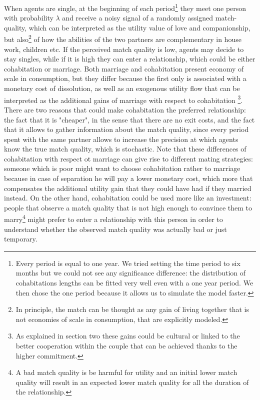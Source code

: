 \documentclass[12pt]{article}
\begin{document}
  When agents are single, at the beginning of each period\footnote{Every period is equal to one year. We tried setting the time period to six months but we could not see any significance difference: the distribution of cohabitations lengths can be fitted very well even with a one year period. We then chose the one period because it allows us to simulate the model faster.} they meet one person with probability $\lambda$ and receive a noisy signal of a randomly assigned match-quality, which can be interpreted as the utility value of love and companionship, but also\footnote{In principle, the match can be thought as any gain of living together that is not economies of scale in consumption, that are explicitly modeled.} of how the abilities of the two partners are complementary in house work, children etc. If the perceived match quality is low, agents may decide to stay singles, while if it is high they can enter a relationship, which could be either cohabitation or marriage. Both marriage and cohabitation present economy of scale in consumption, but they differ because the first only is associated with a monetary cost of dissolution, as well as an exogenous utility flow that can be interpreted as the additional gains of marriage with respect to cohabitation \footnote{As explained in section two these gains could be cultural or linked to the better cooperation within the couple that can be achieved thanks to the higher commitment.}. There are two reasons that could make cohabitation the preferred relationship: the fact that it is "cheaper", in the sense that there are no exit costs, and the fact that it allows to gather information about the match quality, since every period spent with the same partner allows to increase the precision at which agents know the true match quality, which is stochastic. Note that these differences of cohabitation with respect ot marriage can give rise to different mating strategies: someone which is poor might want to choose cohabitation rather to marriage because in case of separation he will pay a lower monetary cost, which more that compensates the additional utility gain that they could have had if they married instead. On the other hand, cohabitation could be used more like an investment: people that observe a match quality that is not high enough to convince them to marry\footnote{A bad match quality is be harmful for utility and an initial lower match quality will result in an expected lower match quality for all the duration of the relationship.} might prefer to enter a relationship with this person in order to understand whether the observed match quality was actually bad or just temporary.
\end{document}

